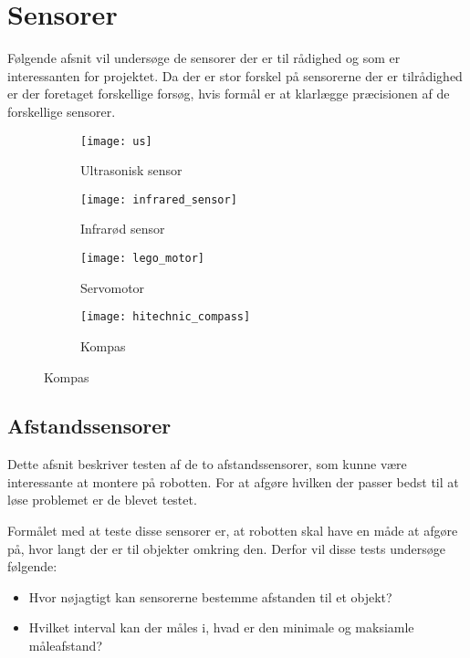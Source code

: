 \section{Sensorer}\label{sensorer}
Følgende afsnit vil undersøge de sensorer der er til rådighed og som er interessanten for projektet.
Da der er stor forskel på sensorerne der er tilrådighed er der foretaget forskellige forsøg, hvis formål er at klarlægge præcisionen af de forskellige sensorer.

\begin{figure}[h]
\centering
\begin{subfigure}[b]{.4\textwidth}
\centering
\texttt{[image: us]}
\caption{Ultrasonisk sensor}
\label{sensor:ultrasonic_sensor}
\end{subfigure}
\begin{subfigure}[b]{.4\textwidth}
\centering
\texttt{[image: infrared\_sensor]}
\caption{Infrarød sensor}
\label{sensor:infraroed_sensor}
\end{subfigure}
\begin{subfigure}[b]{.4\textwidth}
\centering
\texttt{[image: lego\_motor]}
\caption{Servomotor}
\label{sensor:servo_motor}
\end{subfigure}
\begin{subfigure}[b]{.4\textwidth}
\centering
\texttt{[image: hitechnic\_compass]}
\caption{Kompas}
\label{sensor:compass}
\end{subfigure}
\end{figure}

\subsection{Afstandssensorer}
Dette afsnit beskriver testen af de to afstandssensorer, som kunne være interessante at montere på robotten.
For at afgøre hvilken der passer bedst til at løse problemet er de blevet testet.

Formålet med at teste disse sensorer er, at robotten skal have en måde at afgøre på, hvor langt der er til objekter omkring den.
Derfor vil disse tests undersøge følgende:
\begin{itemize}
\item Hvor nøjagtigt kan sensorerne bestemme afstanden til et objekt?
\item Hvilket interval kan der måles i, hvad er den minimale og maksiamle måleafstand?
\end{itemize}

